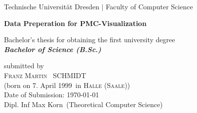 \documentclass[a4paper,12pt,leqno]{article}
\newcommand{\name}{Schmidt}
\newcommand{\vorname}{Franz Martin}
\newcommand{\gebdatum}{7. April 1999}
\newcommand{\ort}{Halle (Saale)}
\newcommand{\betreuer}{Dipl. Inf Max Korn}
\newcommand{\institut}{Theoretical Computer Science}
\newcommand{\thema}{Data Preperation for PMC-Visualization}
\newcommand{\datum}{\today} %
\begin{document}

\begin{titlepage}

\thispagestyle{empty}

\begin{center}

	
{\Large Technische Universit\"{a}t Dresden $\mid$ Faculty of Computer Science}

\vfil\vfil

{\bfseries\Huge\thema}

\vfil\vfil
{\LARGE
Bachelor's thesis for obtaining the first university degree \\[\bigskipamount]
\bfseries{\itshape Bachelor of Science (B.Sc.)}\\[\bigskipamount]
}

\vfil\vfil

\vfil

\vspace{1cm}

submitted by
\\[\bigskipamount]
\textsc{\vorname\ } \MakeUppercase{\name}
\\[\bigskipamount]
(born on \gebdatum\ in \textsc{\ort})
\\[\bigskipamount]
Date of Submission: \datum
\\[\bigskipamount]
\betreuer\ (\institut)
\vspace{-2cm}
\end{center}
\end{titlepage}
%
%
%
%
%
%
\end{document}
